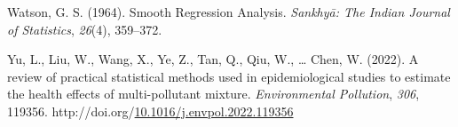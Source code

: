 \documentclass[12pt, twoside]{amherstthesis}
\newenvironment{CSLReferences}[2]%
  {}%
  {\par}
\begin{document}
\begin{CSLReferences}{1}{0}
\leavevmode{}%
Watson, G. S. (1964). Smooth {Regression} {Analysis}. \emph{Sankhyā: The Indian Journal of Statistics}, \emph{26}(4), 359--372.

\leavevmode{}%
Yu, L., Liu, W., Wang, X., Ye, Z., Tan, Q., Qiu, W., \ldots{} Chen, W. (2022). A review of practical statistical methods used in epidemiological studies to estimate the health effects of multi-pollutant mixture. \emph{Environmental Pollution}, \emph{306}, 119356. http://doi.org/\href{https://doi.org/10.1016/j.envpol.2022.119356}{10.1016/j.envpol.2022.119356}

\end{CSLReferences}
\end{document}
